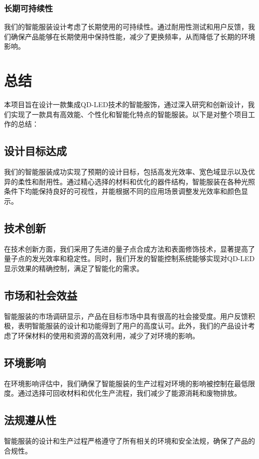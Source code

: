 \documentclass[12pt,hyperref,a4paper,UTF8]{ctexart}
\begin{document}
\subsubsection*{长期可持续性}
我们的智能服装设计考虑了长期使用的可持续性。通过耐用性测试和用户反馈，我们确保产品能够在长期使用中保持性能，减少了更换频率，从而降低了长期的环境影响。


\newpage
\section{总结}
本项目旨在设计一款集成QD-LED技术的智能服饰，通过深入研究和创新设计，我们实现了一款具有高效能、个性化和智能化特点的智能服装。以下是对整个项目工作的总结：

\subsection*{设计目标达成}
我们的智能服装成功实现了预期的设计目标，包括高发光效率、宽色域显示以及优异的柔性和耐用性。通过精心选择的材料和优化的器件结构，智能服装在各种光照条件下均能保持良好的可视性，并能根据不同的应用场景调整发光效率和颜色显示。

\subsection*{技术创新}
在技术创新方面，我们采用了先进的量子点合成方法和表面修饰技术，显著提高了量子点的发光效率和稳定性。同时，我们开发的智能控制系统能够实现对QD-LED显示效果的精确控制，满足了智能化的需求。

\subsection*{市场和社会效益}
智能服装的市场调研显示，产品在目标市场中具有很高的社会接受度。用户反馈积极，表明智能服装的设计和功能得到了用户的高度认可。此外，我们的产品设计考虑了环保材料的使用和资源的高效利用，减少了对环境的影响。

\subsection*{环境影响}
在环境影响评估中，我们确保了智能服装的生产过程对环境的影响被控制在最低限度。通过选择可回收材料和优化生产流程，我们减少了能源消耗和废物排放。

\subsection*{法规遵从性}
智能服装的设计和生产过程严格遵守了所有相关的环境和安全法规，确保了产品的合规性。
\end{document}
